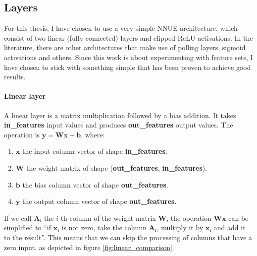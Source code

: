\subsection{Layers}

For this thesis, I have chosen to use a very simple NNUE architecture, which consist of two linear (fully connected) layers and clipped ReLU activations. In the literature, there are other architectures that make use of polling layers, sigmoid activations and others. Since this work is about experimenting with feature sets, I have chosen to stick with something simple that has been proven to achieve good results.

\paragraph[short]{Linear layer} A linear layer is a matrix multiplication followed by a bias addition. It takes \textbf{in\_features} input values and produces \textbf{out\_features} output values. The operation is $\bm{y} = \bm{W} \bm{x} + \bm{b}$, where:

\begin{enumerate}
\item $\bm{x}$ the input column vector of shape \textbf{in\_features}.
\item $\bm{W}$ the weight matrix of shape (\textbf{out\_features}, \textbf{in\_features}).
\item $\bm{b}$ the bias column vector of shape \textbf{out\_features}.
\item $\bm{y}$ the output column vector of shape \textbf{out\_features}.
\end{enumerate}

If we call $\bm{A_i}$ the $i$-th column of the weight matrix $\bm{W}$, the operation $\bm{W} \bm{x}$ can be simplified to \enquote{if $\bm{x_i}$ is not zero, take the column $\bm{A_i}$, multiply it by $\bm{x_i}$ and add it to the result}. This means that we can skip the processing of columns that have a zero input, as depicted in figure \ref{fig:linear_comparison}.

